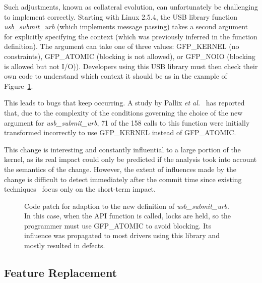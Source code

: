 Such adjustments,
known as collateral evolution, can unfortunately be challenging to implement
correctly. Starting with Linux 2.5.4, the USB library function {\it
usb\_submit\_urb} (which implements message passing) takes a second argument for
explicitly specifying the context (which was previously inferred in the
function definition). The argument can take one of three values: GFP\_KERNEL (no
constraints), GFP\_ATOMIC (blocking is not allowed), or GFP\_NOIO (blocking is
allowed but not I/O)). Developers using this USB library must then check their
own code to understand which context it should be as in the example of Figure~\ref{listing:usb}.

This leads to bugs that keep occurring.
A study by Pallix {\it et al.}~\cite{Palix10Faults} has reported that, due to
the complexity of the conditions governing the choice of the new argument for
{\it usb\_submit\_urb}, 71 of the 158 calls to this function were initially
transformed incorrectly to use GFP\_KERNEL instead of GFP\_ATOMIC.


This change is interesting and constantly influential to a large portion of the
kernel, as its real impact could only be predicted if the analysis took into
account the semantics of the change. However, the extent of influences made by
the change is difficult to detect immediately after
the commit time since existing
techniques~\cite{ren_chianti:_2004,zhang_faulttracer:_2012,robillard_retrieving_2008,sherriff_empirical_2008}
focus only on the short-term impact.


\begin{figure}[!ht]
\centering
{\parbox{\linewidth}{

}}%
\caption{Code patch for adaption to the new definition of {\it usb\_submit\_urb}.
    In this case, when the API function is called, locks are held, so the programmer must use
    GFP\_ATOMIC to avoid blocking. Its influence was propagated to most
    drivers using this library and mostly resulted in defects.}
\label{listing:usb}
\end{figure}


\subsection{Feature Replacement}
\label{sec:motivation2}


